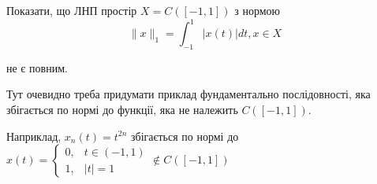 \begin{tcolorbox}[title = Завдання 4]
  Показати, що ЛНП простір $X=C([-1,1])$ з нормою
$$
\|x\|_{1}=\int_{-1}^{1}|x(t)| d t, x \in X
$$

не є повним.

Тут очевидно треба придумати приклад фундаментально послідовності, яка збігається по нормі до функції, яка не належить $C([-1, 1])$.


Наприклад, $x_n(t) = t^{2n}$ збігається по нормі до $x(t) = \begin{cases}
    0, & t \in (-1, 1) \\
    1, & |t| = 1
    \end{cases} \notin C([-1, 1])$
\end{tcolorbox}